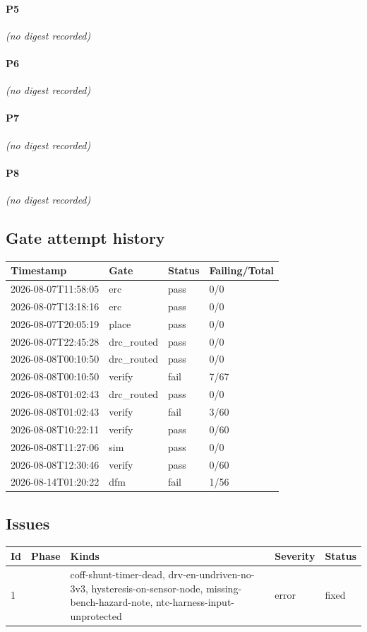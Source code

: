 \documentclass[11pt,a4paper]{article}
\begin{document}
\paragraph*{P5}
\emph{(no digest recorded)}
\paragraph*{P6}
\emph{(no digest recorded)}
\paragraph*{P7}
\emph{(no digest recorded)}
\paragraph*{P8}
\emph{(no digest recorded)}
\subsection*{Gate attempt history}
{\small
\begin{longtable}{llll}
\toprule
\textbf{Timestamp} & \textbf{Gate} & \textbf{Status} & \textbf{Failing/Total} \\
\midrule
\endhead
2026-08-07T11:58:05 & erc & pass & 0/0 \\
2026-08-07T13:18:16 & erc & pass & 0/0 \\
2026-08-07T20:05:19 & place & pass & 0/0 \\
2026-08-07T22:45:28 & drc\_routed & pass & 0/0 \\
2026-08-08T00:10:50 & drc\_routed & pass & 0/0 \\
2026-08-08T00:10:50 & verify & fail & 7/67 \\
2026-08-08T01:02:43 & drc\_routed & pass & 0/0 \\
2026-08-08T01:02:43 & verify & fail & 3/60 \\
2026-08-08T10:22:11 & verify & pass & 0/60 \\
2026-08-08T11:27:06 & sim & pass & 0/0 \\
2026-08-08T12:30:46 & verify & pass & 0/60 \\
2026-08-14T01:20:22 & dfm & fail & 1/56 \\
\bottomrule
\end{longtable}
}
\subsection*{Issues}
{\small
\begin{longtable}{llp{5cm}ll}
\toprule
\textbf{Id} & \textbf{Phase} & \textbf{Kinds} & \textbf{Severity} & \textbf{Status} \\
\midrule
\endhead
1 &  & coff-shunt-timer-dead, drv-en-undriven-no-3v3, hysteresis-on-sensor-node, missing-bench-hazard-note, ntc-harness-input-unprotected & error & fixed \\
\bottomrule
\end{longtable}
}
\end{document}
